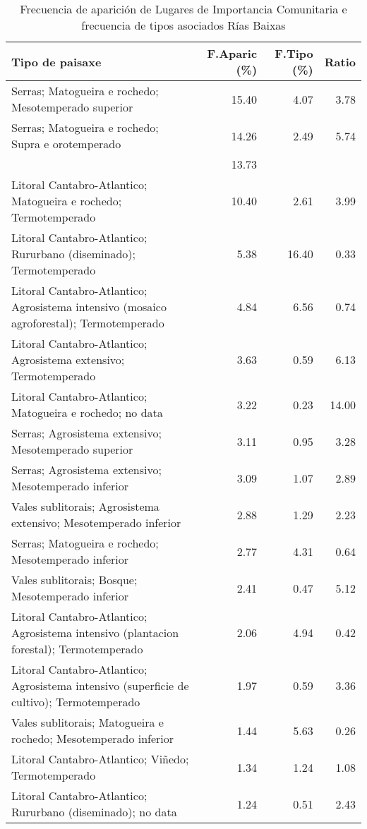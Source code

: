 \begin{table}[p]
\centering
\caption{Frecuencia de aparición de Lugares de Importancia Comunitaria e frecuencia de tipos asociados Rías Baixas} 
\label{vnatura12}
\begin{tabular}{lrrr}
  \hline
Tipo de paisaxe & F.Aparic (\%) & F.Tipo (\%) & Ratio \\ 
  \hline
Serras; Matogueira e rochedo; Mesotemperado superior & 15.40 & 4.07 & 3.78 \\ 
  Serras; Matogueira e rochedo; Supra e orotemperado & 14.26 & 2.49 & 5.74 \\ 
   & 13.73 &  &  \\ 
  Litoral Cantabro-Atlantico; Matogueira e rochedo; Termotemperado & 10.40 & 2.61 & 3.99 \\ 
  Litoral Cantabro-Atlantico; Rururbano (diseminado); Termotemperado & 5.38 & 16.40 & 0.33 \\ 
  Litoral Cantabro-Atlantico; Agrosistema intensivo (mosaico agroforestal); Termotemperado & 4.84 & 6.56 & 0.74 \\ 
  Litoral Cantabro-Atlantico; Agrosistema extensivo; Termotemperado & 3.63 & 0.59 & 6.13 \\ 
  Litoral Cantabro-Atlantico; Matogueira e rochedo; no data & 3.22 & 0.23 & 14.00 \\ 
  Serras; Agrosistema extensivo; Mesotemperado superior & 3.11 & 0.95 & 3.28 \\ 
  Serras; Agrosistema extensivo; Mesotemperado inferior & 3.09 & 1.07 & 2.89 \\ 
  Vales sublitorais; Agrosistema extensivo; Mesotemperado inferior & 2.88 & 1.29 & 2.23 \\ 
  Serras; Matogueira e rochedo; Mesotemperado inferior & 2.77 & 4.31 & 0.64 \\ 
  Vales sublitorais; Bosque; Mesotemperado inferior & 2.41 & 0.47 & 5.12 \\ 
  Litoral Cantabro-Atlantico; Agrosistema intensivo (plantacion forestal); Termotemperado & 2.06 & 4.94 & 0.42 \\ 
  Litoral Cantabro-Atlantico; Agrosistema intensivo (superficie de cultivo); Termotemperado & 1.97 & 0.59 & 3.36 \\ 
  Vales sublitorais; Matogueira e rochedo; Mesotemperado inferior & 1.44 & 5.63 & 0.26 \\ 
  Litoral Cantabro-Atlantico; Viñedo; Termotemperado & 1.34 & 1.24 & 1.08 \\ 
  Litoral Cantabro-Atlantico; Rururbano (diseminado); no data & 1.24 & 0.51 & 2.43 \\ 
   \hline
\end{tabular}
\end{table}
